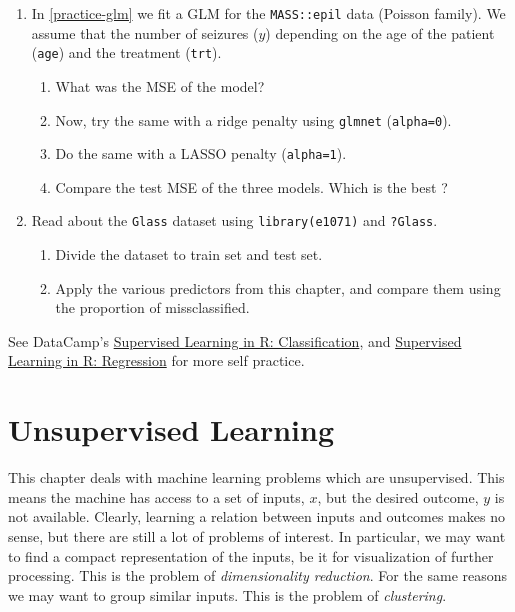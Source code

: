 \documentclass[]{book}
\providecommand{\tightlist}{%
  \setlength{\itemsep}{0pt}\setlength{\parskip}{0pt}}
\theoremstyle{definition}
\theoremstyle{definition}
\theoremstyle{definition}
\theoremstyle{remark}
\begin{document}
\begin{enumerate}
\def\labelenumi{\arabic{enumi}.}
\tightlist
\item
  In \ref{practice-glm} we fit a GLM for the \texttt{MASS::epil} data
  (Poisson family). We assume that the number of seizures (\(y\))
  depending on the age of the patient (\texttt{age}) and the treatment
  (\texttt{trt}).

  \begin{enumerate}
  \def\labelenumii{\arabic{enumii}.}
  \tightlist
  \item
    What was the MSE of the model?
  \item
    Now, try the same with a ridge penalty using \texttt{glmnet}
    (\texttt{alpha=0}).
  \item
    Do the same with a LASSO penalty (\texttt{alpha=1}).
  \item
    Compare the test MSE of the three models. Which is the best ?
  \end{enumerate}
\item
  Read about the \texttt{Glass} dataset using \texttt{library(e1071)}
  and \texttt{?Glass}.

  \begin{enumerate}
  \def\labelenumii{\arabic{enumii}.}
  \tightlist
  \item
    Divide the dataset to train set and test set.
  \item
    Apply the various predictors from this chapter, and compare them
    using the proportion of missclassified.
  \end{enumerate}
\end{enumerate}

See DataCamp's
\href{https://www.datacamp.com/courses/supervised-learning-in-r-classification}{Supervised
Learning in R: Classification}, and
\href{https://www.datacamp.com/courses/supervised-learning-in-r-regression}{Supervised
Learning in R: Regression} for more self practice.

\chapter{Unsupervised Learning}\label{unsupervised}

This chapter deals with machine learning problems which are
unsupervised. This means the machine has access to a set of inputs,
\(x\), but the desired outcome, \(y\) is not available. Clearly,
learning a relation between inputs and outcomes makes no sense, but
there are still a lot of problems of interest. In particular, we may
want to find a compact representation of the inputs, be it for
visualization of further processing. This is the problem of
\emph{dimensionality reduction}. For the same reasons we may want to
group similar inputs. This is the problem of \emph{clustering}.
\end{document}
